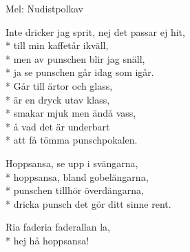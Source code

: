 \begin{SongText}[Punschpolkett]
    \begin{SongInfo}
        Mel: Nudistpolkav
    \end{SongInfo}
    \begin{SongVerse}
        Inte dricker jag sprit, nej det passar ej hit,\\*%
        till min kaffetår ikväll,\\*%
        men av punschen blir jag snäll,\\*%
        ja se punschen går idag som igår.\\*%
        Går till ärtor och glass,\\*%
        är en dryck utav klass,\\*%
        smakar mjuk men ändå vass,\\*%
        å vad det är underbart\\*%
        att få tömma punschpokalen.
    \end{SongVerse}
    \begin{SongVerse}
        Hoppsansa, se upp i svängarna,\\*%
        hoppsansa, bland gobelängarna,\\*%
        punschen tillhör överdängarna,\\*%
        dricka punsch det gör ditt sinne rent.
    \end{SongVerse}
    \begin{SongVerse}
        Ria faderia faderallan la,\\*%
        hej hå hoppsansa!
    \end{SongVerse}\end{SongText}
